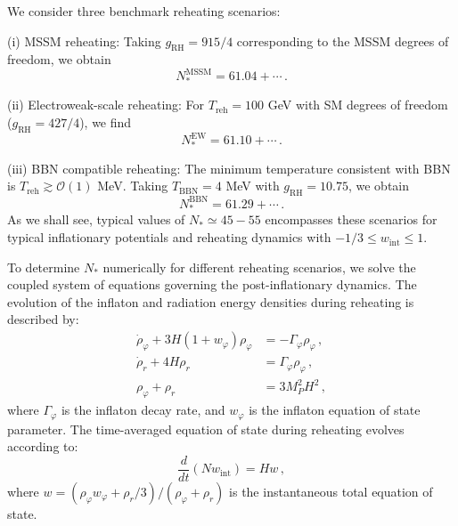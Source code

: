 \documentclass[aps,prev,twocolumn,preprintnumbers,floatfix,nofootinbib]{revtex4-1}
\begin{document}
We consider three benchmark reheating scenarios:

(i) MSSM reheating: Taking $g_{\mathrm{RH}} = 915/4$ corresponding to the MSSM degrees of freedom, we obtain
\begin{equation}
N_*^{\mathrm{MSSM}} = 61.04 + \cdots \, .
\end{equation}

(ii) Electroweak-scale reheating: For $T_{\mathrm{reh}} = 100$ GeV with SM degrees of freedom ($g_{\mathrm{RH}} = 427/4$), we find
\begin{equation}
N_*^{\mathrm{EW}} = 61.10 + \cdots \, .
\end{equation}

(iii) BBN compatible reheating: The minimum temperature consistent with BBN is $T_{\mathrm{reh}} \gtrsim \mathcal{O}(1)$ MeV. Taking $T_{\mathrm{BBN}} = 4$ MeV with $g_{\mathrm{RH}} = 10.75$, we obtain
\begin{equation}
N_*^{\mathrm{BBN}} = 61.29 + \cdots \, .
\end{equation}
As we shall see, typical values of $N_* \simeq 45 - 55$ encompasses these scenarios for typical inflationary potentials and reheating dynamics with $-1/3 \leq w_{\mathrm{int}} \leq 1$.

To determine $N_*$ numerically for different reheating scenarios, we solve the coupled system of equations governing the post-inflationary dynamics. The evolution of the inflaton and radiation energy densities during reheating is described by:
\begin{align}
\label{eq:dyn1}
\dot{\rho}_{\varphi} + 3H(1 + w_\varphi)\rho_{\varphi} &= -\Gamma_{\varphi}\rho_{\varphi} \,, \\
\label{eq:dyn2}
\dot{\rho}_{r} + 4H\rho_{r} &= \Gamma_{\varphi}\rho_{\varphi} \,, \\
\label{eq:dyn3}
\rho_{\varphi}+\rho_{r} &=3 M_{P}^{2} H^{2} \, ,
\end{align}
where $\Gamma_{\varphi}$ is the inflaton decay rate, and $w_\varphi$ is the inflaton equation of state parameter. The time-averaged equation of state during reheating evolves according to:
\begin{equation}
\label{eq:dyn4}
\frac{d}{dt}(Nw_{\mathrm{int}}) = Hw \, ,
\end{equation}
where $w = (\rho_\varphi w_\varphi + \rho_r/3)/(\rho_\varphi + \rho_r)$ is the instantaneous total equation of state.
\end{document}
